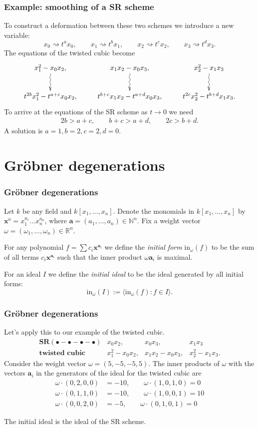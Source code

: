 \documentclass{beamer}
\begin{document}
\begin{frame}%
\frametitle{Example: smoothing of a SR scheme}
To construct a deformation between these two schemes
we introduce a new variable:
$$
x_0\rightsquigarrow t^ax_0,\qquad 
x_1\rightsquigarrow t^bx_1,\qquad 
x_2\rightsquigarrow t^cx_2,\qquad 
x_3\rightsquigarrow t^dx_3.
$$
The equations of the twisted cubic become
$$
\xymatrix{
x_1^2-x_0x_2,\ar@{~>}[d]
&x_1x_2-x_0x_3,\ar@{~>}[d]
&x_2^2-x_1x_3\ar@{~>}[d]\\
t^{2b}x_1^2-t^{a+c}x_0x_2,
&t^{b+c}x_1x_2-t^{a+d}x_0x_3,
&t^{2c}x_2^2-t^{b+d}x_1x_3.
}
$$
\pause
To arrive at the equations of the SR scheme as $t \to 0$
we need
\begin{align*}
2b>a+c,\qquad b+c>a+d,\qquad 2c>b+d.
\end{align*}
A solution is $a=1,b=2,c=2,d=0$.
\end{frame}

\section{Gröbner degenerations}

\begin{frame}%
\frametitle{Gröbner degenerations}
Let $k$ be any field and $k[x_1,\ldots,x_n]$. 
Denote the monomials in 
$k[x_1,\ldots,x_n]$ by $\mathbf{x}^a=x_1^{a_1}\ldots x_n^{a_n}$,
where $\mathbf{a}=(a_1,\ldots,a_n)\in \mathbb{N}^n$.
Fix a weight vector $\omega=(\omega_1,\ldots,\omega_n)\in\mathbb{R}^n$.

\medskip\noindent
For any
polynomial $f=\sum c_i \mathbf{x}^{\mathbf{a}_i}$ we define the 
{\it initial form} $\text{in}_\omega(f)$ to be the sum of all terms
$c_i\mathbf{x}^{\mathbf{a}_i}$ such that the inner product $\omega\mathbf{a}_i$
is maximal. 

\medskip\noindent
For an ideal $I$ we define the {\it initial ideal} to be the ideal
generated by all initial forms:
$$
\text{in}_\omega(I):=\langle\text{in}_\omega(f):f\in I\rangle.
$$
\end{frame}

\begin{frame}%
\frametitle{Gröbner degenerations}
Let's apply this to our example of the twisted cubic.
\[
\begin{array}{cccc}
\textbf{SR}(\bullet-\bullet-\bullet-\bullet) & x_0x_2, & x_0x_3, & x_1x_3 \\
\textbf{twisted cubic} 
& x_1^2-x_0x_2, & x_1x_2-x_0x_3, & x_2^2-x_1x_3.
\end{array}
\]
Consider the weight vector $\omega=(5,-5,-5,5)$.
The inner products of $\omega$ with the vectors $\mathbf{a}_i$
in the generators of the ideal for the twisted cubic are
\begin{align*}
\omega\cdot(0,2,0,0)&=-10,\qquad \omega\cdot(1,0,1,0)=0\\
\omega\cdot(0,1,1,0)&=-10,\qquad \omega\cdot(1,0,0,1)=10\\
\omega\cdot(0,0,2,0)&=-5,\qquad \omega\cdot(0,1,0,1)=0
\end{align*}

\noindent
The initial ideal is the ideal of the SR scheme.
\end{frame}
\end{document}
